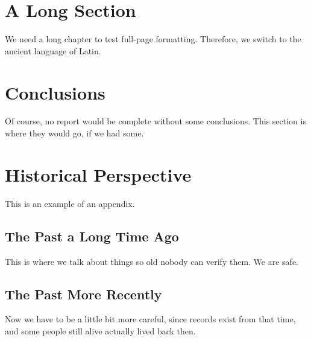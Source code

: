 \documentclass[pdf,ps2pdf,12pt]{smemo}
\begin{document}
\begin{memo}
    \section{A Long Section}\label{sec:long}
    We need a long chapter to test full-page formatting. Therefore, we
    switch to the ancient language of Latin.

    

    \section{Conclusions}
    Of course, no report would be complete without some conclusions.
    This section is where they would go, if we had some.




    
    \normalfont 
    
    

    \clearpage
    \renewcommand{\thesection}{\Alph{section}}
    \setcounter{section}{0}

    \section{Historical Perspective}
    This is an example of an appendix.

    \subsection{The Past a Long Time Ago}
    This is where we talk about things so old nobody can verify them. We
    are safe. 

    \subsection{The Past More Recently}
    Now we have to be a little bit more careful, since records exist from
    that time, and some people still alive actually lived back then.


\end{memo}
\end{document}
